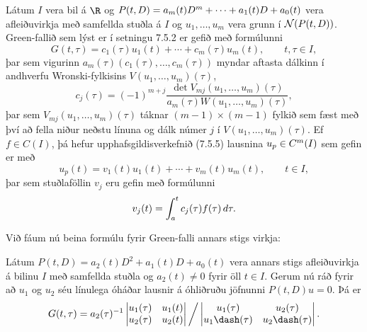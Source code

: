 \begin{se}\label{set2.6.4}
Látum $I$ vera bil á $\R$ og $P(t,D)=a_m(t)D\sp m+\cdots+a_1(t)D+a_0(t)$
vera afleiðuvirkja með
samfellda stuðla á $I$ og $u_1,\dots,u_m$ vera grunn í ${\cal N}(P(t,D))$. 
Green-fallið sem lýst er í setningu 7.5.2
er gefið með formúlunni
 \begin{equation*}G(t,\tau)=c_1(\tau)u_1(t)+\cdots+c_m(\tau)u_m(t), \qquad t,\tau\in I,
\label{2.6.9}
 \end{equation*}
þar sem vigurinn $a_m({\tau})(c_1(\tau),\dots,c_m(\tau))$ myndar aftasta dálkinn
í andhverfu Wronski-fylkisins $V(u_1,\dots,u_m)(\tau)$,
 \begin{equation*}c_j(\tau)=(-1)^{m+j} \dfrac{\det V_{mj}(u_1,\dots,u_m)(\tau)}
{a_m({\tau})W(u_1,\dots, u_m)(\tau)},
\label{2.6.10}
 \end{equation*}
þar sem $V_{mj}(u_1,\dots,u_m)(\tau)$ táknar $(m-1)\times (m-1)$
fylkið sem fæst með því að fella niður neðstu línuna og dálk númer
$j$ í $V(u_1,\dots,u_m)(\tau)$.    Ef $f\in
C(I)$, þá hefur upphafsgildisverkefnið (7.5.5) lausnina $u_p\in C\sp
m(I)$  sem
gefin er með
 \begin{equation*}u_p(t)=v_1(t)u_1(t)+\cdots+v_m(t)u_m(t), \qquad t\in I,\label{2.6.11}
 \end{equation*}
þar sem stuðlaföllin $v_j$ eru gefin með formúlunni
 \begin{equation*}v_j(t)=\int_a\sp t c_j(\tau)f(\tau) \, d\tau.\label{2.6.12}
 \end{equation*}
\end{se}


Við fáum nú beina formúlu fyrir Green-falli annars stigs virkja:

\begin{fs} Látum $P(t,D)=a_2(t)D^2+a_1(t)D+a_0(t)$ vera annars stigs
afleiðuvirkja á bilinu $I$ með samfellda stuðla og $a_2(t)\neq 0$ fyrir
öll $t\in I$. Gerum nú ráð fyrir að $u_1$ og $u_2$ séu línulega óháðar 
lausnir á óhliðruðu jöfnunni $P(t,D)u=0$.  Þá er 
\begin{equation*}
G(t,\tau) 
=a_2(\tau)^{-1}
\left|\begin{matrix}
u_1(\tau) & u_1(t)\\
u_2(\tau) & u_2(t)
\end{matrix}\right|\bigg /
\left|\begin{matrix}
u_1(\tau) & u_2({\tau})\\
u_1\dash(\tau) & u_2\dash({\tau})
\end{matrix}\right|.
\label{2.6.13}
\end{equation*}
\end{fs}

